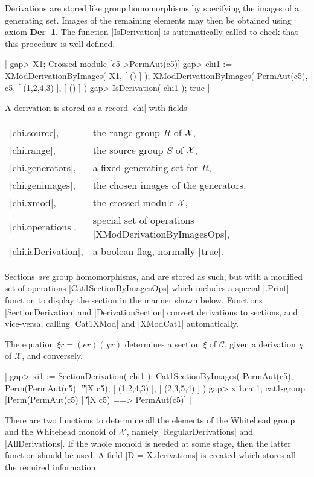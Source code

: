 Derivations are stored like group homomorphisms by specifying the images
of a generating set.  Images of the remaining elements may then be
obtained using axiom  \textbf{Der\ 1}.  The function |IsDerivation|
is automatically called to check that this procedure is well-defined.

|    gap> X1;
    Crossed module [c5->PermAut(c5)]
    gap> chi1 := XModDerivationByImages( X1, [ () ] );
    XModDerivationByImages( PermAut(c5), c5, [ (1,2,4,3) ], [ () ] )
    gap> IsDerivation( chi1 );
    true  |

A derivation is stored as a record |chi| with fields\:

\begin{tabular}{ll}
|chi.source|,      & the range group $R$ of ${\cal X}$,         \\
|chi.range|,       & the source group $S$ of ${\cal X}$,        \\
|chi.generators|,  & a fixed generating set for $R$,            \\
|chi.genimages|,   & the chosen images of the generators,       \\
|chi.xmod|,        & the crossed module ${\cal X}$,             \\
|chi.operations|,  & special set of operations |XModDerivationByImagesOps|, \\
|chi.isDerivation|,& a boolean flag, normally |true|.
\end{tabular}

Sections \emph{are} group homomorphisms, and are stored as such, but with
a modified set of operations  |Cat1SectionByImagesOps|  which includes
a special |.Print| function to display the section in the manner shown below.
Functions |SectionDerivation| and |DerivationSection| convert derivations to 
sections, and vice-versa, calling |Cat1XMod| and |XModCat1| automatically.

The equation   $\xi r = (er)(\chi r)$   determines a section   
$\xi$  of  $\mathcal{C}$,  given a derivation  $\chi$  of
$\mathcal{X}$, and conversely.

|    gap> xi1 := SectionDerivation( chi1 );
    Cat1SectionByImages( PermAut(c5), Perm(PermAut(c5) |'\|'|X c5),
        [ (1,2,4,3) ], [ (2,3,5,4) ] )
    gap> xi1.cat1;
    cat1-group [Perm(PermAut(c5) |'\|'|X c5) ==> PermAut(c5)]  |

There are two functions to determine all the elements of the Whitehead group 
and the Whitehead monoid of ${\cal X}$,
namely  |RegularDerivations| and |AllDerivations|.  
If the whole monoid is needed at some stage, then the latter function 
should be used.  
A field  |D = X.derivations|  is created which stores all the required 
information\:

